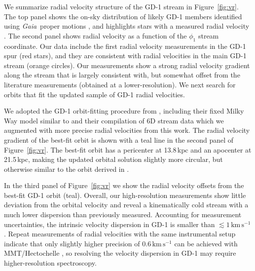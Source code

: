 \documentclass[twocolumn]{aastex63}
\newcommand{\gaia}{\textsl{Gaia}}
\newcommand{\kms}{\ensuremath{\textrm{km}\,\textrm{s}^{-1}}}
\begin{document}
We summarize radial velocity structure of the GD-1 stream in Figure~\ref{fig:vr}.
The top panel shows the on-sky distribution of likely GD-1 members identified using \gaia\ proper motions \citep[small points,][]{pwb}, and highlights stars with a measured radial velocity \citep[orange / red for this work, gray for literature data from][]{koposov2010}.
The second panel shows radial velocity as a function of the $\phi_1$ stream coordinate.
Our data include the first radial velocity measurements in the GD-1 spur (red stars), and they are consistent with radial velocities in the main GD-1 stream (orange circles).
Our measurements show a strong radial velocity gradient along the stream that is largely consistent with, but somewhat offset from the literature measurements (obtained at a lower-resolution).
We next search for orbits that fit the updated sample of GD-1 radial velocities.

We adopted the GD-1 orbit-fitting procedure from \citet{pwb}, including their fixed Milky Way model similar to \citet{bovy2015} and their compilation of 6D stream data which we augmented with more precise radial velocities from this work.
The radial velocity gradient of the best-fit orbit is shown with a teal line in the second panel of Figure~\ref{fig:vr}.
The best-fit orbit has a pericenter at 13.8\,kpc and an apocenter at 21.5\,kpc, making the updated orbital solution slightly more circular, but otherwise similar to the orbit derived in \citet{pwb}.

In the third panel of Figure~\ref{fig:vr} we show the radial velocity offsets from the best-fit GD-1 orbit (teal).
Overall, our high-resolution measurements show little deviation from the orbital velocity and reveal a kinematically cold stream with a much lower dispersion than previously measured.
Accounting for measurement uncertainties, the intrinsic velocity dispersion in GD-1 is smaller than $\lesssim1\,\kms$.
Repeat measurements of radial velocities with the same instrumental setup indicate that only slightly higher precision of $0.6\,\kms$ can be achieved with MMT/Hectochelle \citep{cargile2019}, so resolving the velocity dispersion in GD-1 may require higher-resolution spectroscopy.

\end{document}
